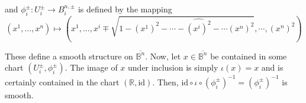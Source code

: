 \documentclass{article}
\newcommand{\R}{\mathbb{R}}
\begin{document}
and $\phi_i^{\pm} : U_i^{\pm} \rightarrow B_i^{n, \pm}$ is defined by the mapping \
\[ (x^1, \dots, x^n) \mapsto \left( x^1, \dots, x^i \mp \sqrt{1 - (x^1)^2 - \cdots - \widehat{(x^i)^2} - \cdots (x^n)^2}, \cdots, (x^n)^2 \right) \]

These define a smooth structure on $\overline{\mathbb{B}^n}$. Now, let $x \in \overline{\mathbb{B}^n}$ be contained in some chart $(U_i^{\pm}, \phi_i^{\pm})$. The image of $x$ under inclusion is simply $\iota(x) = x$ and is certainly contained in the chart $(\R, \mathrm{id})$. Then,
$\mathrm{id} \circ \iota \circ (\phi_i^{\pm})^{-1} = (\phi_i^{\pm})^{-1}$ is smooth.






\vskip 0.25cm

\end{document}
